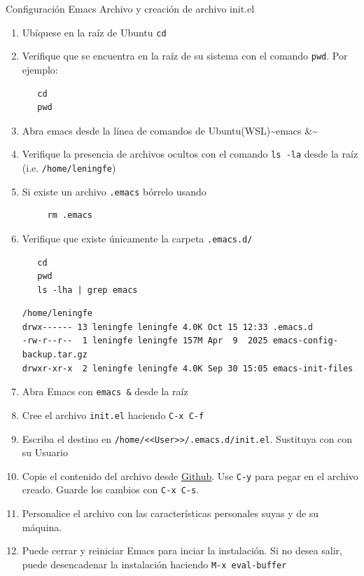 \documentclass[presentation]{beamer}
\begin{document}
\begin{frame}{Configuración Emacs Archivo y creación de archivo init.el}
 \begin{enumerate}
\item Ubíquese en la raíz de Ubuntu \texttt{cd}
\item Verifique que se encuentra en la raíz de su sistema con el comando
\texttt{pwd}. Por ejemplo:
\begin{verbatim}
   cd
   pwd
\end{verbatim}

\item Abra emacs desde la línea de comandos de Ubuntu(WSL)\textasciitilde{}emacs \&\textasciitilde{}

\item Verifique la presencia de archivos ocultos con el comando \texttt{ls -la}
desde la raíz (i.e. \texttt{/home/leningfe})

\item Si existe un archivo \texttt{.emacs} bórrelo usando
\begin{verbatim}
     rm .emacs
\end{verbatim}

\item Verifique que existe únicamente la carpeta \texttt{.emacs.d/}
\begin{verbatim}
   cd 
   pwd
   ls -lha | grep emacs
\end{verbatim}

\begin{verbatim}
/home/leningfe
drwx------ 13 leningfe leningfe 4.0K Oct 15 12:33 .emacs.d
-rw-r--r--  1 leningfe leningfe 157M Apr  9  2025 emacs-config-backup.tar.gz
drwxr-xr-x  2 leningfe leningfe 4.0K Sep 30 15:05 emacs-init-files
\end{verbatim}

\item Abra Emacs con \texttt{emacs \&} desde la raíz

\item Cree el archivo \texttt{init.el} haciendo \texttt{C-x C-f}

\item Escriba el destino en \texttt{/home/<{}<{}User>{}>{}/.emacs.d/init.el}. Sustituya
con \label{orgae61dc5} con su Usuario

\item Copie el contenido del archivo desde \href{https://github.com/LeninGF/EPN-Lectures/blob/main/iccd332ArqComp/configEmacs/init.el}{Github}. Use \texttt{C-y}
para pegar en el archivo creado. Guarde los cambios con \texttt{C-x C-s}.

\item Personalice el archivo con las características personales suyas y
de su máquina.

\item Puede cerrar y reiniciar Emacs para inciar la instalación. Si no
desea salir, puede desencadenar la instalación haciendo \texttt{M-x eval-buffer}
\end{enumerate}
\end{frame}
\end{document}
